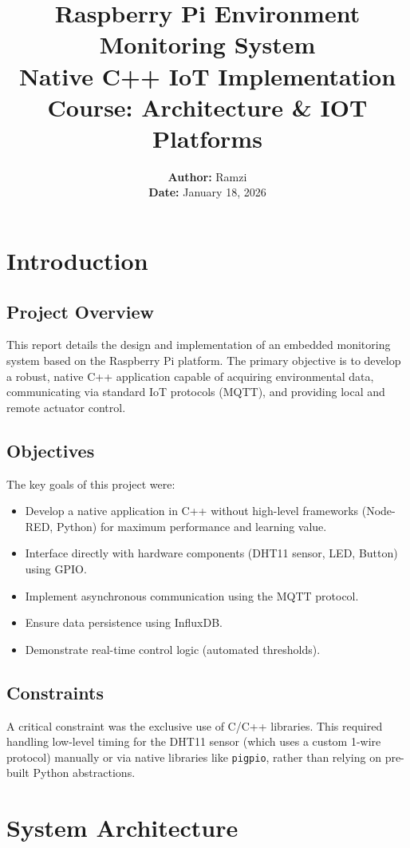 \documentclass[12pt, a4paper]{article}
\title{
    \vspace{2cm}
    \Huge \textbf{Raspberry Pi Environment Monitoring System}\\
    \Large \textbf{Native C++ IoT Implementation}\\
    \vspace{1cm}
    \large \textbf{Course:} Architecture \& IOT Platforms\\
    \vspace{3cm}
}
\author{\textbf{Author:} Ramzi \\ \textbf{Date:} January 18, 2026}
\date{}
\begin{document}
\maketitle
\thispagestyle{empty}
\newpage

\tableofcontents
\newpage

\section{Introduction}
\subsection{Project Overview}
This report details the design and implementation of an embedded monitoring system based on the Raspberry Pi platform. The primary objective is to develop a robust, native C++ application capable of acquiring environmental data, communicating via standard IoT protocols (MQTT), and providing local and remote actuator control.

\subsection{Objectives}
The key goals of this project were:
\begin{itemize}
    \item Develop a native application in C++ without high-level frameworks (Node-RED, Python) for maximum performance and learning value.
    \item Interface directly with hardware components (DHT11 sensor, LED, Button) using GPIO.
    \item Implement asynchronous communication using the MQTT protocol.
    \item Ensure data persistence using InfluxDB.
    \item Demonstrate real-time control logic (automated thresholds).
\end{itemize}

\subsection{Constraints}
A critical constraint was the exclusive use of C/C++ libraries. This required handling low-level timing for the DHT11 sensor (which uses a custom 1-wire protocol) manually or via native libraries like \texttt{pigpio}, rather than relying on pre-built Python abstractions.

\newpage

\section{System Architecture}
\end{document}
